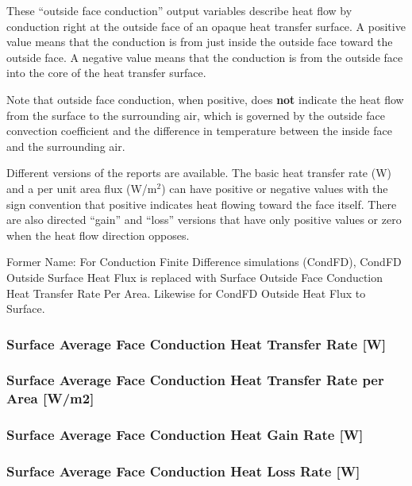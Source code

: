 These ``outside face conduction'' output variables describe heat flow by conduction right at the outside face of an opaque heat transfer surface. A positive value means that the conduction is from just inside the outside face toward the outside face. A negative value means that the conduction is from the outside face into the core of the heat transfer surface.

Note that outside face conduction, when positive, does \textbf{not} indicate the heat flow from the surface to the surrounding air, which is governed by the outside face convection coefficient and the difference in temperature between the inside face and the surrounding air.

Different versions of the reports are available. The basic heat transfer rate (W) and a per unit area flux (W/m\(^{2}\)) can have positive or negative values with the sign convention that positive indicates heat flowing toward the face itself. There are also directed ``gain'' and ``loss'' versions that have only positive values or zero when the heat flow direction opposes.

Former Name: For Conduction Finite Difference simulations (CondFD), CondFD Outside Surface Heat Flux is replaced with Surface Outside Face Conduction Heat Transfer Rate Per Area. Likewise for CondFD Outside Heat Flux to Surface.

\subsubsection{Surface Average Face Conduction Heat Transfer Rate {[}W{]}}\label{surface-average-face-conduction-heat-transfer-rate-w}

\subsubsection{Surface Average Face Conduction Heat Transfer Rate per Area {[}W/m2{]}}\label{surface-average-face-conduction-heat-transfer-rate-per-area-wm2}

\subsubsection{Surface Average Face Conduction Heat Gain Rate {[}W{]}}\label{surface-average-face-conduction-heat-gain-rate-w}

\subsubsection{Surface Average Face Conduction Heat Loss Rate {[}W{]}}\label{surface-average-face-conduction-heat-loss-rate-w}

